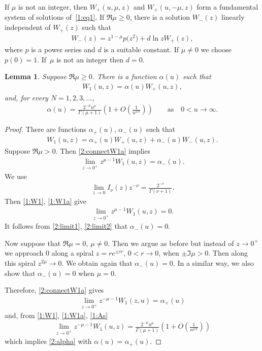 \documentclass[pdftex]{sigma}
\numberwithin{equation}{section}
\newtheorem{Lemma}[Theorem]{Lemma}
{ \theoremstyle{definition}
\newtheorem{Remarks}[Theorem]{Remarks} }
\begin{document}
If $\mu$ is not an integer, then $W_+(u,\mu,z)$ and $W_+(u,-\mu,z)$ form a fundamental system of solutions of~\eqref{1:eq1}.
If $\Re \mu\ge 0$, there is a solution $W_-(z)$ linearly independent of $W_+(z)$ such that
\begin{gather*}%
W_-(z)=z^{1-\mu}p\big(z^2\big)+ d \ln z W_+(z),
\end{gather*}
where $p$ is a power series and $d$ is a suitable constant. If $\mu\ne 0$ we choose $p(0)=1$. If~$\mu$ is not an integer then $d=0$.

\begin{Lemma}\label{2:l1}
Suppose $\Re\mu\ge 0$.
There is a function $\alpha(u)$ such that
\begin{gather*}%
W_1(u,z)=\alpha(u)W_+(u,z),
\end{gather*}
and, for every $N=1,2,3,\dots$,
\begin{gather}\label{2:alpha}
\alpha(u)=\frac{2^{-\mu}u^\mu}{\Gamma(\mu+1)}\left(1+O\left(\frac1{u^{2N}}\right)\right)\qquad\text{as} \quad 0<u\to\infty.
\end{gather}
\end{Lemma}

\begin{proof}
There are functions $\alpha_+(u)$, $\alpha_-(u)$ such that
\begin{gather}\label{2:connectW1a}
W_1(u,z)=\alpha_+(u)W_+(u,z)+\alpha_-(u)W_-(u,z).
\end{gather}
Suppose $\Re\mu>0$. Then \eqref{2:connectW1a} implies
\begin{gather}\label{2:limit1}
\lim_{z\to0^+} z^{\mu-1}W_1(u,z)=\alpha_-(u).
\end{gather}
We use \cite[(10.30.1)]{NIST}
\begin{gather*}%
 \lim_{z\to0} I_\nu(z)z^{-\nu}=\frac{2^{-\nu}}{\Gamma(\nu+1)}.
\end{gather*}
Then \eqref{1:W1}, \eqref{1:W1a} give{\samepage
\begin{gather}\label{2:limit2}
\lim_{z\to0^+} z^{\mu-1}W_1(u,z)= 0.
\end{gather}
It follows from \eqref{2:limit1}, \eqref{2:limit2} that $\alpha_-(u)=0$.}

Now suppose that $\Re\mu=0$, $\mu\ne 0$. Then we argue as before but instead of $z\to0^+$ we approach $0$ along a spiral $z=re^{\pm i r}$, $0<r\to 0$, when $\pm \Im \mu>0$.
Then along this spiral $z^{2\mu}\to 0$. We obtain again that $\alpha_-(u)=0$.
In a similar way, we also show that $\alpha_-(u)=0$ when $\mu=0$.

Therefore, \eqref{2:connectW1a} gives
\begin{gather*} \lim_{z\to0^+} z^{-\mu-1} W_1(z,u)=\alpha_+(u)\end{gather*}
and, from \eqref{1:W1}, \eqref{1:W1a}, \eqref{1:As}
\begin{gather*} \lim_{z\to0^+} z^{-\mu-1}W_1(u,z)=\frac{2^{-\mu}u^\mu}{\Gamma(\mu+1)}\left(1+O\left(\frac1{u^{2N}}\right)\right)\end{gather*}
which implies \eqref{2:alpha} with $\alpha(u)=\alpha_+(u)$.
\end{proof}
\end{document}
